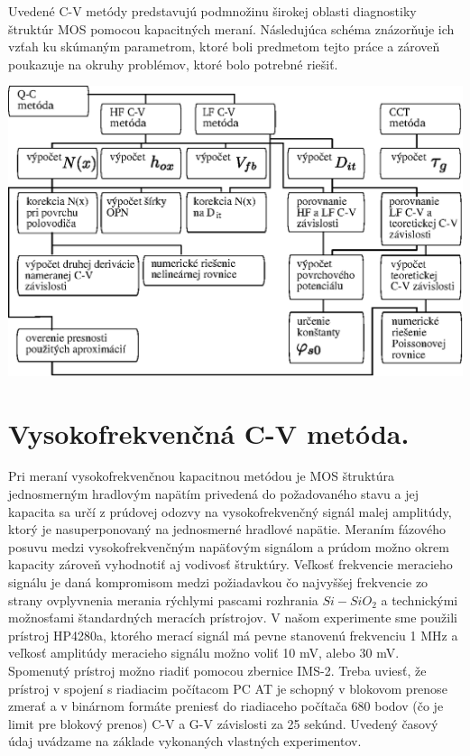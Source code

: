 Uvedené C-V metódy predstavujú podmnožinu širokej oblasti diagnostiky
štruktúr MOS pomocou kapacitných meraní.  Následujúca schéma
znázorňuje ich vzťah ku skúmaným parametrom, ktoré boli predmetom
tejto práce a zároveň poukazuje na okruhy problémov, ktoré bolo
potrebné riešiť.

\begin{diagram}
  \centering
  \includegraphics[width=\textwidth,height=\textheight,scale=0.7,keepaspectratio]{Figures/diagram-1.EPS}\label{diagram:1}
\end{diagram}

\section{Vysokofrekvenčná C-V metóda.}\label{sec:3.1}

Pri meraní vysokofrekvenčnou kapacitnou metódou je MOS štruktúra
jednosmerným hradlovým napätím privedená do požadovaného stavu a jej
kapacita sa určí z prúdovej odozvy na vysokofrekvenčný signál malej
amplitúdy, ktorý je nasuperponovaný na jednosmerné hradlové
napätie. Meraním fázového posuvu medzi vysokofrekvenčným napäťovým
signálom a prúdom možno okrem kapacity zároveň vyhodnotiť aj vodivosť
štruktúry. Veľkosť frekvencie meracieho signálu je daná kompromisom
medzi požiadavkou čo najvyššej frekvencie zo strany ovplyvnenia
merania rýchlymi pascami rozhrania $Si-SiO_2$ a technickými možnosťami
štandardných meracích prístrojov.  V našom experimente sme použili
prístroj HP4280a, ktorého merací signál má pevne stanovenú frekvenciu
1 MHz a veľkosť amplitúdy meracieho signálu možno voliť 10 mV, alebo
30 mV.  Spomenutý prístroj možno riadiť pomocou zbernice IMS-2. Treba
uviesť, že prístroj v spojení s riadiacim počítacom PC AT je schopný v
blokovom prenose zmerať a v binárnom formáte preniesť do riadiaceho
počítača 680 bodov (čo je limit pre blokový prenos) C-V a G-V
závislosti za 25 sekúnd.  Uvedený časový údaj uvádzame na základe
vykonaných vlastných experimentov.

